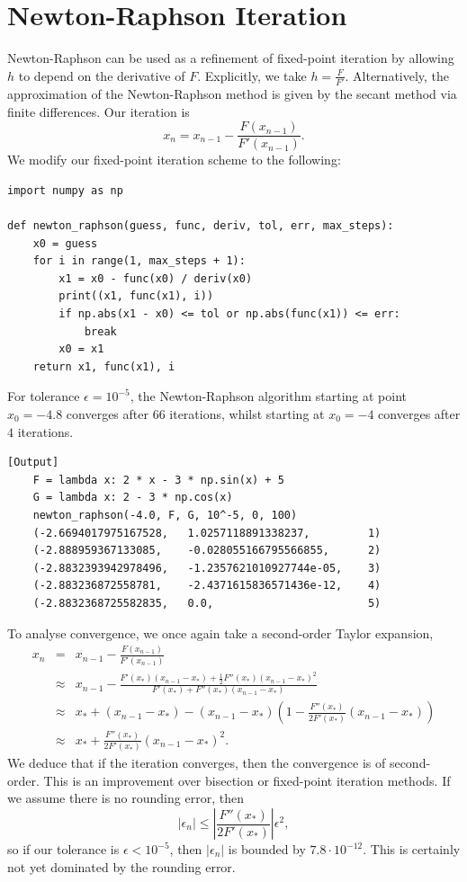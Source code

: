 \documentclass{article}
\begin{document}
\section{Newton-Raphson Iteration}

Newton-Raphson can be used as a refinement of fixed-point iteration by allowing \(h\) to depend on the derivative of \(F\). Explicitly, we take \(h = \frac{F}{F'}\). Alternatively, the approximation of the Newton-Raphson method is given by the secant method via finite differences. Our iteration is
\[ x_n = x_{n-1} - \frac{F(x_{n-1})}{F'(x_{n-1})}. \]
We modify our fixed-point iteration scheme to the following:

\begin{verbatim}
import numpy as np

def newton_raphson(guess, func, deriv, tol, err, max_steps):
    x0 = guess
    for i in range(1, max_steps + 1):
        x1 = x0 - func(x0) / deriv(x0)
        print((x1, func(x1), i))
        if np.abs(x1 - x0) <= tol or np.abs(func(x1)) <= err:
            break
        x0 = x1
    return x1, func(x1), i
\end{verbatim}

For tolerance \(\epsilon = 10^{-5}\), the Newton-Raphson algorithm starting at point \(x_0 = -4.8\) converges after \(66\) iterations, whilst starting at \(x_0 = -4\) converges after \(4\) iterations.

\begin{verbatim}[Output]
    F = lambda x: 2 * x - 3 * np.sin(x) + 5
    G = lambda x: 2 - 3 * np.cos(x)
    newton_raphson(-4.0, F, G, 10^-5, 0, 100)
    (-2.6694017975167528,   1.0257118891338237,         1)
    (-2.888959367133085,    -0.028055166795566855,      2)
    (-2.8832393942978496,   -1.2357621010927744e-05,    3)
    (-2.883236872558781,    -2.4371615836571436e-12,    4)
    (-2.8832368725582835,   0.0,                        5)
\end{verbatim}

To analyse convergence, we once again take a second-order Taylor expansion,
\begin{eqnarray*}
    x_n &=& x_{n-1} - \frac{F(x_{n-1})}{F'(x_{n-1})} \\
        &\approx& x_{n-1} - \frac{F'(x_*)(x_{n-1} - x_*) + \frac{1}{2}F''(x_*)(x_{n-1} - x_*)^2}{F'(x_*) + F''(x_*)(x_{n-1} - x_*)} \\
        &\approx& x_* + (x_{n-1} - x_*) - (x_{n-1} - x_*)\left(1 - \frac{F''(x_*)}{2F'(x_*)}(x_{n-1} - x_*)\right) \\
        &\approx& x_* + \frac{F''(x_*)}{2F'(x_*)}(x_{n-1} - x_*)^2.
\end{eqnarray*}
We deduce that if the iteration converges, then the convergence is of second-order. This is an improvement over bisection or fixed-point iteration methods. If we assume there is no rounding error, then
\[ |\epsilon_n| \leq \left|\frac{F''(x_*)}{2F'(x_*)}\right|\epsilon^2, \]
so if our tolerance is \(\epsilon  < 10^{-5}\), then \(|\epsilon_n|\) is bounded by \(7.8 \cdot 10^{-12}\). This is certainly not yet dominated by the rounding error.
\end{document}
